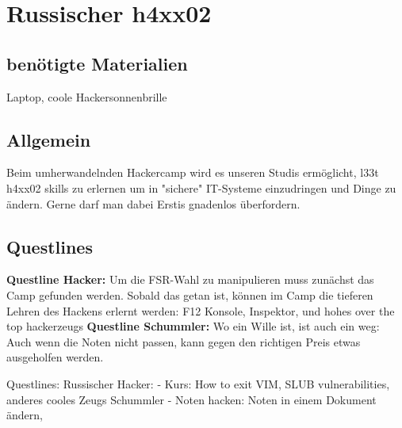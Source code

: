 \section{Russischer h4xx02}
\subsection{benötigte Materialien}
Laptop, coole Hackersonnenbrille

\subsection{Allgemein}
Beim umherwandelnden Hackercamp wird es unseren Studis ermöglicht, l33t h4xx02 skills zu erlernen um in "sichere" IT-Systeme einzudringen und Dinge zu ändern. Gerne darf man dabei Erstis gnadenlos überfordern.

\subsection{Questlines}
\textbf{Questline  Hacker:}
Um die FSR-Wahl zu manipulieren muss zunächst das Camp gefunden werden. Sobald das getan ist, können im Camp die tieferen Lehren des Hackens erlernt werden: F12 Konsole, Inspektor, und hohes over the top hackerzeugs
\textbf{Questline  Schummler:} Wo ein Wille ist, ist auch ein weg: Auch wenn die Noten nicht passen, kann gegen den richtigen Preis etwas ausgeholfen werden.

Questlines: Russischer Hacker: - Kurs: How to exit VIM, SLUB vulnerabilities, anderes cooles Zeugs
Schummler - Noten hacken: Noten in einem Dokument ändern, 